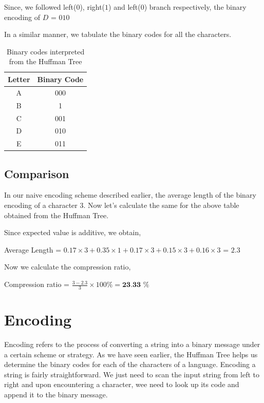 \documentclass[18pt]{article}
\begin{document}
Since, we followed left($0$), right($1$) and left($0$) branch respectively,  the binary encoding of $D$ = \textbf{$010$}

In a similar manner, we tabulate the binary codes for all the characters.

\begin{table}[h]
	\centering
	\begin{tabular}{|c|c|}
		\hline
		\textbf{Letter} & \textbf{Binary Code} \\
		\hline
		A & 000  \\
		B & 1  \\
		C & 001 \\
		D & 010 \\
		E & 011 \\
						\hline
	\end{tabular}
	\caption{Binary codes interpreted from the Huffman Tree}
\end{table}


\subsection{Comparison}

In our naive encoding scheme described earlier, the average length of the binary encoding of a character $3$. Now let’s calculate the same for the above table obtained from the Huffman Tree.

Since expected value is additive, we obtain,

Average Length = $0.17 \times 3 + 0.35 \times 1 + 0.17 \times 3 + 0.15 \times 3 + 0.16 \times 3$ = $2.3$

Now we calculate the compression ratio,

Compression ratio = $\frac{3-2.3}{3} \times 100 \% = \textbf{23.33 \%} $

\newpage

\section{Encoding}

Encoding refers to the process of converting a string into a binary message under a certain scheme or strategy. As we have seen earlier, the Huffman Tree helps us determine the binary codes for each of the characters of a language. Encoding a string is fairly straightforward. We just need to scan the input string from left to right and upon encountering a character, wee need to look up its code and append it to the binary message.
\end{document}
